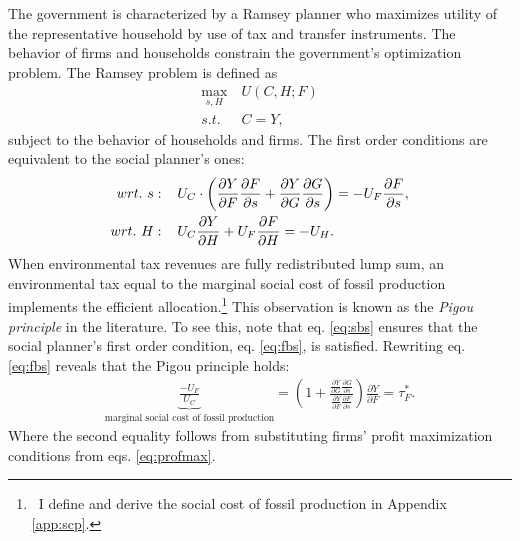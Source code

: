 The government is characterized by a Ramsey planner who maximizes utility of the representative household by use of tax and transfer instruments. The behavior of firms and households constrain the government's optimization problem. 
The Ramsey problem is defined as
\begin{align*}
\underset{s, H}{\max}\ & U(C,H; F)\\ s.t.\ \ &  C=Y,
\end{align*}
subject to the behavior of households and firms.
The first order conditions are equivalent to the social planner's ones:
\begin{align}
wrt.\ s:\hspace{4mm} & U_C\cdot\left(\frac{\partial Y}{\partial F}\frac{\partial F}{\partial s}+\frac{\partial Y}{\partial G}\frac{\partial G}{\partial s}\right)=-U_F\frac{\partial F}{\partial s}, \label{eq:sbs}
\\
wrt.\ H:\hspace{4mm} & U_C\frac{\partial Y}{\partial H}+U_F\frac{\partial F}{\partial H}=-U_H\label{eq:sbh}. 
\end{align}
When environmental tax revenues are fully redistributed lump sum, an environmental tax equal to the marginal social cost of fossil production implements the efficient allocation.\footnote{\ I define and derive the social cost of fossil production in Appendix \ref{app:scp}.} This observation is known as the \textit{Pigou principle} in the literature. 
To see this, note that eq. \eqref{eq:sbs} ensures that the social planner's first order condition, eq. \eqref{eq:fbs}, is satisfied. 
Rewriting eq. \eqref{eq:fbs} reveals that the Pigou principle holds: %
\begin{align*}
\underbrace{\frac{-U_F}{U_C}}_{\text{marginal social cost of fossil production}}=\left(1+\frac{\frac{\partial Y}{\partial G}\frac{\partial G}{\partial s}}{\frac{\partial Y}{\partial F}\frac{\partial F}{\partial s}}\right)\frac{\partial Y}{\partial F}=\tau^*_F.
\end{align*}
Where the second equality follows from substituting firms' profit maximization conditions from eqs. \eqref{eq:profmax}.

